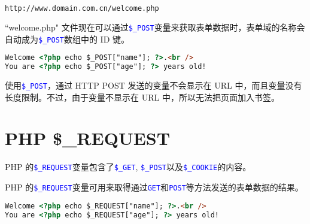 \begin{lstlisting}[language=bash]
http://www.domain.com.cn/welcome.php
\end{lstlisting}

``welcome.php" 文件现在可以通过\textcolor{Blue}{\texttt{\$\_POST}}变量来获取表单数据时，表单域的名称会自动成为\textcolor{Blue}{\texttt{\$\_POST}}数组中的 ID 键。

\begin{lstlisting}[language=HTML]
Welcome <?php echo $_POST["name"]; ?>.<br />
You are <?php echo $_POST["age"]; ?> years old!
\end{lstlisting}


使用\textcolor{Blue}{\texttt{\$\_POST}}，通过 HTTP POST 发送的变量不会显示在 URL 中，而且变量没有长度限制。不过，由于变量不显示在 URL 中，所以无法把页面加入书签。







\chapter{PHP \$\_REQUEST}


PHP 的\textcolor{Blue}{\texttt{\$\_REQUEST}}变量包含了\textcolor{Blue}{\texttt{\$\_GET}}, \textcolor{Blue}{\texttt{\$\_POST}}以及\textcolor{Blue}{\texttt{\$\_COOKIE}}的内容。

PHP 的\textcolor{Blue}{\texttt{\$\_REQUEST}}变量可用来取得通过\textcolor{Blue}{\texttt{GET}}和\textcolor{Blue}{\texttt{POST}}等方法发送的表单数据的结果。



\begin{lstlisting}[language=HTML]
Welcome <?php echo $_REQUEST["name"]; ?>.<br />
You are <?php echo $_REQUEST["age"]; ?> years old!
\end{lstlisting}

























































